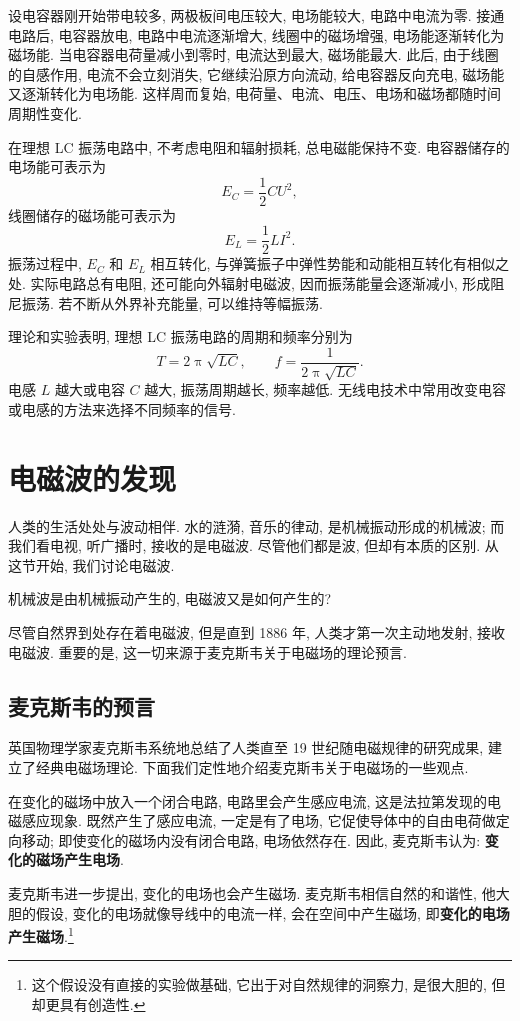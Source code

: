 \documentclass[UTF8,openany,fontset=fandol]{ctexbook}
\theoremstyle{chinesetextbook}
\begin{document}
设电容器刚开始带电较多, 两极板间电压较大, 电场能较大, 电路中电流为零. 接通电路后, 电容器放电, 电路中电流逐渐增大, 线圈中的磁场增强, 电场能逐渐转化为磁场能. 当电容器电荷量减小到零时, 电流达到最大, 磁场能最大. 此后, 由于线圈的自感作用, 电流不会立刻消失, 它继续沿原方向流动, 给电容器反向充电, 磁场能又逐渐转化为电场能. 这样周而复始, 电荷量、电流、电压、电场和磁场都随时间周期性变化.

在理想 LC 振荡电路中, 不考虑电阻和辐射损耗, 总电磁能保持不变. 电容器储存的电场能可表示为
\[
E_C=\frac12CU^2,
\]
线圈储存的磁场能可表示为
\[
E_L=\frac12LI^2.
\]
振荡过程中, $E_C$ 和 $E_L$ 相互转化, 与弹簧振子中弹性势能和动能相互转化有相似之处. 实际电路总有电阻, 还可能向外辐射电磁波, 因而振荡能量会逐渐减小, 形成阻尼振荡. 若不断从外界补充能量, 可以维持等幅振荡.

理论和实验表明, 理想 LC 振荡电路的周期和频率分别为
\[
T=2\uppi\sqrt{LC},\qquad f=\frac{1}{2\uppi\sqrt{LC}}.
\]
电感 $L$ 越大或电容 $C$ 越大, 振荡周期越长, 频率越低. 无线电技术中常用改变电容或电感的方法来选择不同频率的信号.
\section{电磁波的发现}
人类的生活处处与波动相伴. 水的涟漪, 音乐的律动, 是机械振动形成的机械波; 而我们看电视, 听广播时, 接收的是电磁波. 尽管他们都是波, 但却有本质的区别. 从这节开始, 我们讨论电磁波.

机械波是由机械振动产生的, 电磁波又是如何产生的?

尽管自然界到处存在着电磁波, 但是直到 1886 年, 人类才第一次主动地发射, 接收电磁波. 重要的是, 这一切来源于麦克斯韦关于电磁场的理论预言.
\subsection{麦克斯韦的预言}\label{sec:电磁场理论}
英国物理学家麦克斯韦系统地总结了人类直至 19 世纪随电磁规律的研究成果, 建立了经典电磁场理论. 下面我们定性地介绍麦克斯韦关于电磁场的一些观点.

在变化的磁场中放入一个闭合电路, 电路里会产生感应电流, 这是法拉第发现的电磁感应现象. 既然产生了感应电流, 一定是有了电场, 它促使导体中的自由电荷做定向移动; 即使变化的磁场内没有闭合电路, 电场依然存在. 因此, 麦克斯韦认为: \textbf{变化的磁场产生电场}.

麦克斯韦进一步提出, 变化的电场也会产生磁场. 麦克斯韦相信自然的和谐性, 他大胆的假设, 变化的电场就像导线中的电流一样, 会在空间中产生磁场, 即\textbf{变化的电场产生磁场}.\footnote{这个假设没有直接的实验做基础, 它出于对自然规律的洞察力, 是很大胆的, 但却更具有创造性.}
\end{document}
